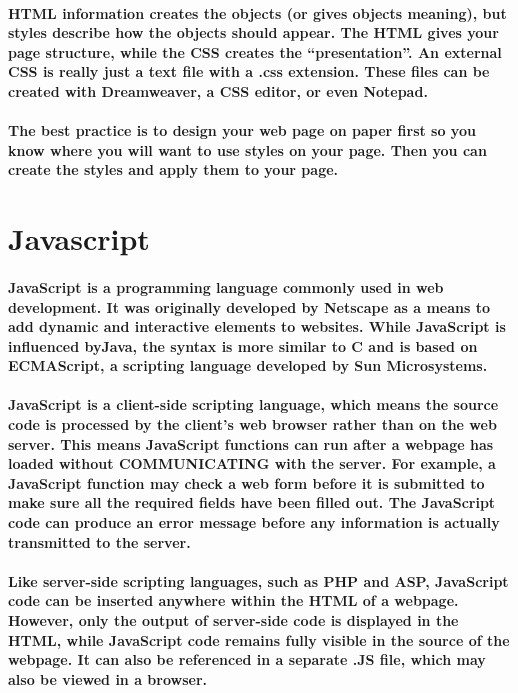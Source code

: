 \documentclass[12pt]{report}
\begin{document}
        \paragraph
        {
        HTML information creates the objects (or gives objects meaning), but styles describe how the objects should appear. The HTML gives your page structure, while the CSS creates the “presentation”.  An external CSS is really just a text file with a .css extension.  These files can be created with Dreamweaver, a CSS editor, or even Notepad.
        }
        \paragraph
        {
        The best practice is to design your web page on paper first so you know where you will want to use styles on your page. Then you can create the styles and apply them to your page.
        }
        \section{Javascript}
        \paragraph
        {
        JavaScript is a programming language commonly used in web development. It was originally developed by Netscape as a means to add dynamic and interactive elements to websites. While JavaScript is influenced byJava, the syntax is more similar to C and is based on ECMAScript, a scripting language developed by Sun Microsystems. 
        }
        \paragraph
        {
        JavaScript is a client-side scripting language, which means the source code is processed by the client's web browser rather than on the web server. This means JavaScript functions can run after a webpage has loaded without COMMUNICATING with the server. For example, a JavaScript function may check a web form before it is submitted to make sure all the required fields have been filled out. The JavaScript code can produce an error message before any information is actually transmitted to the server. 
        }
        \paragraph
        {
        Like server-side scripting languages, such as PHP and ASP, JavaScript code can be inserted anywhere within the HTML of a webpage. However, only the output of server-side code is displayed in the HTML, while JavaScript code remains fully visible in the source of the webpage. It can also be referenced in a separate .JS file, which may also be viewed in a browser.
        }
\end{document}
